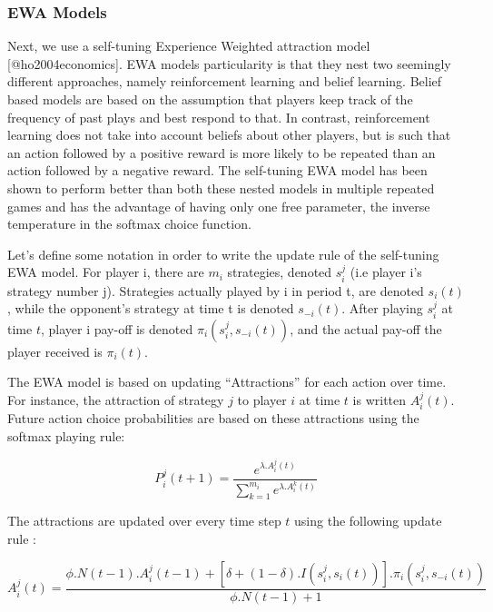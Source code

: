 \documentclass[man,floatsintext]{apa6}
\begin{document}
\hypertarget{ewa-models}{%
\subsubsection{EWA Models}\label{ewa-models}}

Next, we use a self-tuning Experience Weighted attraction model {[}@ho2004economics{]}. EWA models particularity is that they nest two seemingly different approaches, namely reinforcement learning and belief learning. Belief based models are based on the assumption that players keep track of the frequency of past plays and best respond to that. In contrast, reinforcement learning does not take into account beliefs about other players, but is such that an action followed by a positive reward is more likely to be repeated than an action followed by a negative reward. The self-tuning EWA model has been shown to perform better than both these nested models in multiple repeated games and has the advantage of having only one free parameter, the inverse temperature in the softmax choice function.

Let's define some notation in order to write the update rule of the self-tuning EWA model. For player i, there are \(m_{i}\) strategies, denoted \(s_{i}^{j}\) (i.e player i's strategy number j). Strategies actually played by i in period t, are denoted \(s_{i}(t)\), while the opponent's strategy at time t is denoted \(s_{-i}(t)\). After playing \(s_{i}^{j}\) at time \(t\), player i pay-off is denoted \(\pi_{i}(s_{i}^{j},s_{-i}(t))\), and the actual pay-off the player received is \(\pi_{i}(t)\).

The EWA model is based on updating \enquote{Attractions} for each action over time. For instance, the attraction of strategy \(j\) to player \(i\) at time \(t\) is written \(A_{i}^{j}(t)\). Future action choice probabilities are based on these attractions using the softmax playing rule:

\[P_{i}^{j}(t+1) = \frac{e^{\lambda . A_{i}^{j}(t)}}{\sum_{k=1}^{m_{i}}e^{\lambda . A_{i}^{k}(t)}} \]

The attractions are updated over every time step \(t\) using the following update rule :

\[ A_{i}^{j}(t) =  \frac{\phi . N(t-1) . A_{i}^{j}(t-1) + [ \delta + (1-\delta) . I(s_{i}^{j},s_{i}(t))] . \pi_{i}(s_{i}^{j},s_{-i}(t)) } {\phi . N(t-1) + 1} \]
\end{document}
